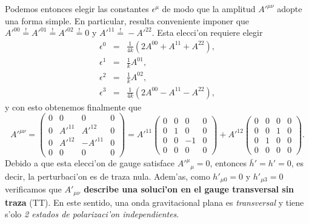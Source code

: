 Podemos entonces elegir las constantes $\epsilon^\mu$ de modo que la amplitud $A'^{\mu\nu}$ adopte una forma simple. En particular, resulta conveniente imponer que $A'^{00}\stackrel{!}{=}A'^{01}\stackrel{!}{=}A'^{02}\stackrel{!}{=}0$ y $A'^{11}\stackrel{!}{=}-A'^{22}$. Esta elecci'on requiere elegir
\begin{eqnarray}
\epsilon^0&=&\frac{1}{4k}\left(2A^{00}+A^{11}+A^{22}\right),\\
\epsilon^1&=&\frac{1}{k}A^{01},\\
\epsilon^2&=&\frac{1}{k}A^{02},\\
\epsilon^3&=&\frac{1}{4k}\left(2A^{00}-A^{11}-A^{22}\right),
\end{eqnarray}
y con esto obtenemos finalmente que
\begin{equation}\label{AApf}
 A'^{\mu\nu}=\left(\begin{array}{cccc}
0 & 0 & 0 & 0 \\
0 & A'^{11} & A'^{12} & 0 \\
0 & A'^{12} & -A'^{11} & 0 \\
0 & 0 & 0 & 0 \end{array}
\right)=A'^{11}\left(\begin{array}{cccc}
0 & 0 & 0 & 0 \\
0 & 1 & 0 & 0 \\
0 & 0 & -1 & 0 \\
0 & 0 & 0 & 0 \end{array}
\right)+A'^{12}\left(\begin{array}{cccc}
0 & 0 & 0 & 0 \\
0 & 0 & 1 & 0 \\
0 & 1 & 0 & 0 \\
0 & 0 & 0 & 0 \end{array}
\right).
\end{equation}
Debido a que esta elecci'on de gauge satisface $A'^\mu{}_\mu=0$, entonces $\bar{h}'=h'=0$, es decir, la perturbaci'on es de traza nula. 
Adem'as, como $h'_{\mu 0}=0$ y $h'_{\mu 3}=0$ 
verificamos que \textbf{$A'_{\mu\nu}$ describe una soluci'on en el gauge transversal sin traza} (TT). En este sentido, una onda gravitacional plana es \textit{transversal} y tiene s'olo \textit{2 estados de polarizaci'on independientes}.

